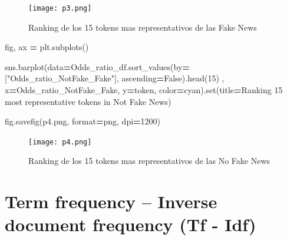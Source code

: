 \documentclass[
  11pt,
  a4paper,
]{article}
\newenvironment{Shaded}{\begin{snugshade}}{\end{snugshade}}
\newcommand{\BuiltInTok}[1]{#1}
\newcommand{\DecValTok}[1]{\textcolor[rgb]{0.00,0.00,0.81}{#1}}
\newcommand{\NormalTok}[1]{#1}
\newcommand{\OperatorTok}[1]{\textcolor[rgb]{0.81,0.36,0.00}{\textbf{#1}}}
\newcommand{\StringTok}[1]{\textcolor[rgb]{0.31,0.60,0.02}{#1}}
\newcommand{\VariableTok}[1]{\textcolor[rgb]{0.00,0.00,0.00}{#1}}
\begin{document}
\begin{figure}
\centering
\texttt{[image: p3.png]}
\caption{Ranking de los 15 tokens mas representativos de las Fake News}
\end{figure}

\begin{Shaded}
\begin{Highlighting}[]
\NormalTok{fig, ax }\OperatorTok{=}\NormalTok{ plt.subplots()}

\NormalTok{sns.barplot(data}\OperatorTok{=}\NormalTok{Odds\_ratio\_df.sort\_values(by}\OperatorTok{=}\NormalTok{[}\StringTok{"Odds\_ratio\_NotFake\_Fake"}\NormalTok{], ascending}\OperatorTok{=}\VariableTok{False}\NormalTok{).head(}\DecValTok{15}\NormalTok{) ,}
\NormalTok{                 x}\OperatorTok{=}\StringTok{\textquotesingle{}Odds\_ratio\_NotFake\_Fake\textquotesingle{}}\NormalTok{, y}\OperatorTok{=}\StringTok{\textquotesingle{}token\textquotesingle{}}\NormalTok{, color}\OperatorTok{=}\StringTok{\textquotesingle{}cyan\textquotesingle{}}\NormalTok{).}\BuiltInTok{set}\NormalTok{(title}\OperatorTok{=}\StringTok{\textquotesingle{}Ranking 15 most representative tokens in Not Fake News\textquotesingle{}}\NormalTok{) }
                 
\NormalTok{fig.savefig(}\StringTok{\textquotesingle{}p4.png\textquotesingle{}}\NormalTok{, }\BuiltInTok{format}\OperatorTok{=}\StringTok{\textquotesingle{}png\textquotesingle{}}\NormalTok{, dpi}\OperatorTok{=}\DecValTok{1200}\NormalTok{)}
\end{Highlighting}
\end{Shaded}

\begin{figure}
\centering
\texttt{[image: p4.png]}
\caption{Ranking de los 15 tokens mas representativos de las No Fake
News}
\end{figure}

\hypertarget{term-frequency-inverse-document-frequency-tf---idf}{%
\section{Term frequency -- Inverse document frequency (Tf -
Idf)}\label{term-frequency-inverse-document-frequency-tf---idf}}
\end{document}
